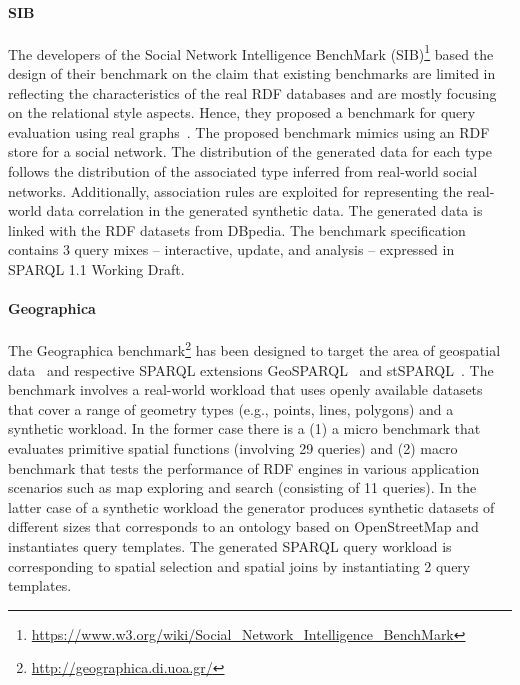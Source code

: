 \paragraph{SIB} The developers of the Social Network Intelligence BenchMark (SIB)\footnote{\url{https://www.w3.org/wiki/Social_Network_Intelligence_BenchMark}} based the design of their benchmark on the claim that existing benchmarks are limited in reflecting the characteristics of the real RDF databases and are mostly focusing on the relational style aspects. Hence, they proposed a benchmark for  query evaluation using real graphs~\cite{sib}. The proposed benchmark mimics using an RDF store for a social network. \iffalse site where users and their interactions form a social graph of social activities such as creating/managing groups, writing posts and posting comments.\fi The distribution of the generated data for each type follows the  distribution of the associated type inferred from real-world social networks. Additionally, association rules are exploited for representing the real-world data correlation in the generated synthetic data. The  generated data is linked with the RDF datasets from DBpedia. The benchmark specification contains 3 query mixes -- interactive, update, and analysis -- expressed in SPARQL 1.1 Working Draft.

\paragraph{Geographica} The Geographica benchmark\footnote{\url{http://geographica.di.uoa.gr/}} has been designed to target the area of geospatial data~\cite{DBLP:conf/semweb/GarbisKK13} and respective SPARQL extensions GeoSPARQL~\cite{battle2012enabling} and stSPARQL~\cite{koubarakis2010modeling}. The benchmark involves a real-world workload that uses openly available datasets that cover a range of geometry types (e.g., points, lines, polygons) and  a synthetic workload. In the former case there is a (1) a micro benchmark that evaluates primitive spatial functions (involving 29 queries) and (2) macro benchmark that tests the performance of RDF engines in various application scenarios such as  map exploring and search (consisting of 11 queries). In the latter case of a synthetic workload the generator produces synthetic datasets of different sizes that corresponds to an ontology based on OpenStreetMap  and instantiates query templates. \iffalse The spatial extent of the land ownership dataset constitutes a uniform grid of $n \times n$ hexagons, whereas the size of each dataset is given relatively to $n$.\fi The generated SPARQL query workload is corresponding to spatial selection and spatial joins by instantiating 2 query templates.



